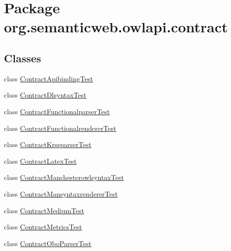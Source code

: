 \hypertarget{namespaceorg_1_1semanticweb_1_1owlapi_1_1contract}{\section{Package org.\-semanticweb.\-owlapi.\-contract}
\label{namespaceorg_1_1semanticweb_1_1owlapi_1_1contract}
}
\subsection*{Classes}
\begin{DoxyCompactItemize}
\item 
class \hyperlink{classorg_1_1semanticweb_1_1owlapi_1_1contract_1_1_contract_apibinding_test}{Contract\-Apibinding\-Test}
\item 
class \hyperlink{classorg_1_1semanticweb_1_1owlapi_1_1contract_1_1_contract_dlsyntax_test}{Contract\-Dlsyntax\-Test}
\item 
class \hyperlink{classorg_1_1semanticweb_1_1owlapi_1_1contract_1_1_contract_functionalparser_test}{Contract\-Functionalparser\-Test}
\item 
class \hyperlink{classorg_1_1semanticweb_1_1owlapi_1_1contract_1_1_contract_functionalrenderer_test}{Contract\-Functionalrenderer\-Test}
\item 
class \hyperlink{classorg_1_1semanticweb_1_1owlapi_1_1contract_1_1_contract_krssparser_test}{Contract\-Krssparser\-Test}
\item 
class \hyperlink{classorg_1_1semanticweb_1_1owlapi_1_1contract_1_1_contract_latex_test}{Contract\-Latex\-Test}
\item 
class \hyperlink{classorg_1_1semanticweb_1_1owlapi_1_1contract_1_1_contract_manchesterowlsyntax_test}{Contract\-Manchesterowlsyntax\-Test}
\item 
class \hyperlink{classorg_1_1semanticweb_1_1owlapi_1_1contract_1_1_contract_mansyntaxrenderer_test}{Contract\-Mansyntaxrenderer\-Test}
\item 
class \hyperlink{classorg_1_1semanticweb_1_1owlapi_1_1contract_1_1_contract_medium_test}{Contract\-Medium\-Test}
\item 
class \hyperlink{classorg_1_1semanticweb_1_1owlapi_1_1contract_1_1_contract_metrics_test}{Contract\-Metrics\-Test}
\item 
class \hyperlink{classorg_1_1semanticweb_1_1owlapi_1_1contract_1_1_contract_obo_parser_test}{Contract\-Obo\-Parser\-Test}
\item 

\end{DoxyCompactItemize}
